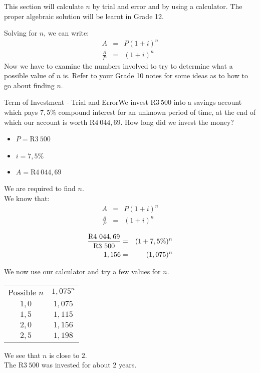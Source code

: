 This section will calculate $n$ by trial and error and by using a calculator. The proper algebraic solution will be learnt in Grade 12.

Solving for $n$, we can write:
\begin{eqnarray*}
A &=& P(1+i)^n\\
\frac{A}{P}&=&(1+i)^n
\end{eqnarray*}
Now we have to examine the numbers involved to try to determine what a possible value of $n$ is. Refer to your Grade 10 notes for some ideas as to how to go about finding $n$.


\begin{wex}{Term of Investment - Trial and Error}{We invest R$3~500$ into a savings account which pays $7,5\%$ compound interest for an unknown period of time, at the end of which our account is worth R$4~044,69$. How long did we invest the money?\\}{
\begin{itemize}
\item{$P=$R$3~500$}
\item{$i=7,5\%$}
\item{$A=$R$4~044,69$}
\end{itemize}
We are required to find $n$.\\
We know that:
\begin{eqnarray*}
A &=& P(1+i)^n\\
\frac{A}{P}&=&(1+i)^n
\end{eqnarray*}

\begin{eqnarray*}
\frac{\rm{R}4~044,69}{\rm{R}3~500}&=&(1+7,5\%)^n\\
1,156&=&(1,075)^n
\end{eqnarray*}

We now use our calculator and try a few values for $n$.
\begin{center}
\begin{tabular}{|c|c|}\hline\hline
Possible $n$ & $1,075^n$\\
$1,0$ & $1,075$\\
$1,5$ & $1,115$\\
$2,0$ & $1,156$\\
$2,5$ & $1,198$\\
\end{tabular}
\end{center}
We see that $n$ is close to $2$.\\
The R$3~500$ was invested for about 2 years.}
\end{wex}

